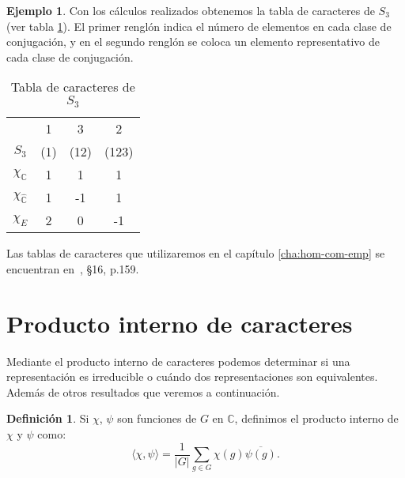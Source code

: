 \documentclass[12pt]{book}
\theoremstyle{definition}
\newtheorem{definition}[theorem]{Definición}
\newtheorem{example}[theorem]{Ejemplo}
\newcounter{in}
\newcounter{ini}
\begin{document}
\begin{example}
Con los cálculos realizados obtenemos la tabla de caracteres de
$S_{3}$ (ver tabla \ref{tabla-car-S3}). El primer renglón indica el
número de elementos en cada clase de conjugación, y en el segundo
renglón se coloca un elemento representativo de cada clase de
conjugación.
\begin{table}[htpb]
  \centering
  \begin{tabular}{ c| c c c}
      & 1 & 3 & 2 \\
      $S_{3}$ & (1) & (12) & (123) \\
      \hline
      $\chi_{\mathbb{C}}$ & 1 & 1 & 1 \\
      $\chi_{\mathbb{\hat C}}$ & 1 & -1 & 1 \\
      $\chi_{E}$ & 2 & 0 & -1 
    \end{tabular}
    
  \caption{Tabla de caracteres de $S_{3}$}
  \label{tabla-car-S3}
\end{table}

Las tablas de caracteres que utilizaremos en el capítulo
\ref{cha:hom-com-emp} se encuentran en~\cite{liebeck}, \S 16, p.159.
\end{example}

\section{Producto interno de caracteres}
\label{producto-interno}


Mediante el producto interno de caracteres  podemos determinar si una
representación es irreducible o cuándo dos representaciones son
equivalentes. Además de otros resultados que veremos a continuación.

\begin{definition}
  \label{producto-interno-de-funciones}
  Si $\chi$, $\psi$ son funciones de $G$ en $\mathbb{C}$, definimos el
  producto interno de $\chi$ y $\psi$ como:
  \begin{equation*}
    \langle\chi,\psi\rangle=\frac{1}{|G|}\sum_{g\in G}\chi(g)\overline{\psi(g)}.
  \end{equation*}
\end{definition}
\end{document}
